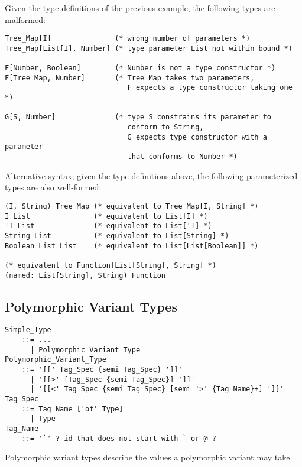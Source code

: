 Given the type definitions of the previous example, the following types are malformed: 

\begin{lstlisting}
Tree_Map[I]               (* wrong number of parameters *)
Tree_Map[List[I], Number] (* type parameter List not within bound *)

F[Number, Boolean]        (* Number is not a type constructor *)
F[Tree_Map, Number]       (* Tree_Map takes two parameters, 
                             F expects a type constructor taking one *)

G[S, Number]              (* type S constrains its parameter to
                             conform to String, 
                             G expects type constructor with a parameter
                             that conforms to Number *)
\end{lstlisting}

\example Alternative syntax; given the type definitions above, the following parameterized types are also well-formed:

\begin{lstlisting}
(I, String) Tree_Map (* equivalent to Tree_Map[I, String] *)
I List               (* equivalent to List[I] *)
'I List              (* equivalent to List['I] *)
String List          (* equivalent to List[String] *)
Boolean List List    (* equivalent to List[List[Boolean]] *)

(* equivalent to Function[List[String], String] *)
(named: List[String], String) Function
\end{lstlisting}





\subsection{Polymorphic Variant Types}
\label{sec:polymorphic-variant-types}

\grammar\begin{lstlisting}[deletekeywords={not,with,or}]
Simple_Type 
    ::= ...
      | Polymorphic_Variant_Type
Polymorphic_Variant_Type 
    ::= '[[' Tag_Spec {semi Tag_Spec} ']]'
      | '[[>' [Tag_Spec {semi Tag_Spec}] ']]'
      | '[[<' Tag_Spec {semi Tag_Spec} [semi '>' {Tag_Name}+] ']]'
Tag_Spec 
    ::= Tag_Name ['of' Type]
      | Type
Tag_Name 
    ::= '`' ? id that does not start with ` or @ ?
\end{lstlisting}

Polymorphic variant types describe the values a polymorphic variant may take. 


